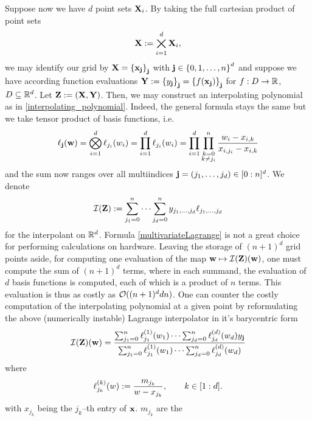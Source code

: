 \documentclass[12pt, oneside]{amsart}
\theoremstyle{definition}
\theoremstyle{remark}
\numberwithin{equation}{section}
\begin{document}
Suppose now we have \(d\) point sets \(\XX_i\). By taking the full cartesian 
product of point sets \[
\XX \defn \bigtimes_{i=1}^d \XX_i,
\] we may identify our grid by \(\XX = \set{\bfx_\bfj}_{\bfj}\) with \(\bfj \in 
\set{0,1,\dots,n}^d\) and suppose we have according function evaluations \(\YY 
\defn \set{y_\bfj}_\bfj = \set{f(\bfx_\bfj)}_\bfj\) for \(f: D \to \R\), \(D 
\subseteq \R^d\). Let \(\ZZ \defn (\XX, \YY)\). Then, we may construct an 
interpolating polynomial as in \cref{interpolating_polynomial}. Indeed, the 
general formula stays the same but we take tensor product of basis functions, 
i.e. \begin{equation}\label{multivariateLagrange}
	\ell_\bfj(\bfw) = \bigotimes_{i=1}^d \ell_{j_i}(w_i) = \prod_{i=1}^d 
	\ell_{j_i}(w_i) = \prod_{i=1}^d \prod_{\substack{k=0 \\ k \neq j_i}}^n 
	\frac{w_i - x_{i, k}}{x_{i, j_i} - x_{i, k}}
\end{equation}
and the sum now ranges over all multiindices \(\bfj = (j_1, \dots, j_d) \in 
\indexset[0]{n}^d\). We denote 
\begin{equation}\label{eq:interpolantdD}
	\cI(\ZZ) \defn \sum_{j_1 = 0}^n \cdots \sum_{j_d = 0}^n y_{j_1, \dots, j_d} 
	\ell_{j_1, \dots, j_d}
\end{equation}
for the interpolant on \(\R^d\).
Formula \ref{multivariateLagrange} is not a great choice for performing 
calculations on hardware. Leaving the storage of \((n+1)^d\) grid points aside, 
for computing one evaluation of the map \(\bfw \mapsto \cI(\ZZ)(\bfw)\), one 
must compute the sum of \((n+1)^d\) terms, where in each summand, the 
evaluation of \(d\) basis functions is computed, each of which is a product of 
\(n\) terms. This evaluation is thus as costly as \(\cO((n+1)^d d n)\). One can 
counter the costly computation of the interpolating polynomial at a given point 
by reformulating the above (numerically instable) Lagrange interpolator in it's 
barycentric form
\begin{equation}\label{eq:multivarBarycentric}
	\cI(\ZZ)(\bfw) = \frac{\sum_{j_1=0}^{n} \ell^{(1)}_{j_1}(w_1) \cdots 
	\sum_{j_d=0}^{n} \ell^{(d)}_{j_d}(w_d) y_\bfj}{\sum_{j_1=0}^{n} 
	\ell^{(1)}_{j_1}(w_1) \cdots \sum_{j_d=0}^{n} \ell^{(d)}_{j_d}(w_d)}
\end{equation}
where
\begin{equation}\label{eq:barycentricBasis}
	\ell^{(k)}_{j_k}(w) \defn \frac{m_{j_k}}{w-x_{j_k}}, \qquad k \in 
	\indexset[1]{d}.
\end{equation}
with \(x_{j_k}\) being the \(j_k\)--th entry of \(\bfx\). \(m_{j_k}\) are the 
\end{document}
